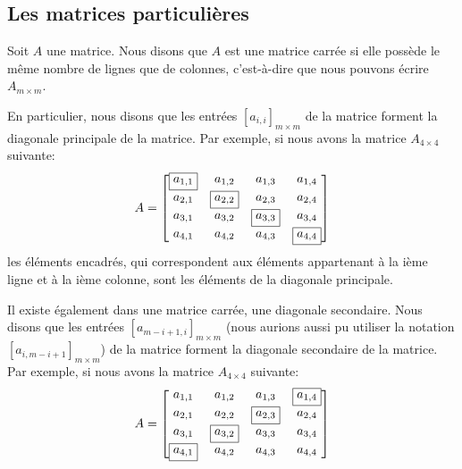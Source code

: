 \documentclass[]{book}
\theoremstyle{definition}
\theoremstyle{definition}
\theoremstyle{definition}
\theoremstyle{remark}
\let\BeginKnitrBlock\begin \let\EndKnitrBlock\end
\begin{document}
\hypertarget{sec:matrice-particuliere}{%
\subsection{Les matrices particulières}\label{sec:matrice-particuliere}}

\BeginKnitrBlock{definition}[Une matrice carrée]
\protect\hypertarget{def:unnamed-chunk-46}{}{\label{def:unnamed-chunk-46} {} }Soit \(A\) une matrice. Nous disons que \(A\) est une matrice carrée si elle possède le même nombre de lignes que de colonnes, c'est-à-dire que nous pouvons écrire \(A_{m \times m}\).

En particulier, nous disons que les entrées \([a_{i,i}]_{m \times m}\) de la matrice forment la diagonale principale de la matrice. Par exemple, si nous avons la matrice \(A_{4\times 4}\) suivante:
\begin{align*}
A = \begin{bmatrix}
\fbox{$a_{1,1}$} & a_{1,2} & a_{1,3} & a_{1,4} \\
a_{2,1} & \fbox{$a_{2,2}$} & a_{2,3} & a_{2,4} \\
a_{3,1} & a_{3,2} & \fbox{$a_{3,3}$} & a_{3,4} \\
a_{4,1} & a_{4,2} & a_{4,3} & \fbox{$a_{4,4}$} \\
\end{bmatrix}
\end{align*}
les éléments encadrés, qui correspondent aux éléments appartenant à la ième ligne et à la ième colonne, sont les éléments de la diagonale principale.

Il existe également dans une matrice carrée, une diagonale secondaire. Nous disons que les entrées \([a_{m-i+1,i}]_{m \times m}\) (nous aurions aussi pu utiliser la notation \([a_{i,m-i+1}]_{m \times m}\)) de la matrice forment la diagonale secondaire de la matrice. Par exemple, si nous avons la matrice \(A_{4\times 4}\) suivante:
\begin{align*}
A = \begin{bmatrix}
a_{1,1} & a_{1,2} & a_{1,3} & \fbox{$a_{1,4}$} \\
a_{2,1} & a_{2,2} & \fbox{$a_{2,3}$} & a_{2,4} \\
a_{3,1} & \fbox{$a_{3,2}$} & a_{3,3} & a_{3,4} \\
\fbox{$a_{4,1}$} & a_{4,2} & a_{4,3} & a_{4,4} \\
\end{bmatrix}
\end{align*}
\EndKnitrBlock{definition}
\end{document}
